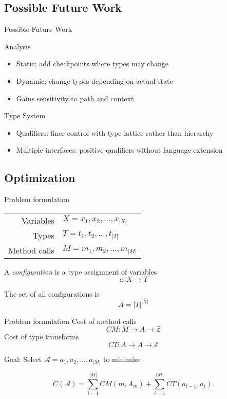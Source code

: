\documentclass{beamer}
\newcommand{\ZZ}{\mathbb{Z}}
\newcommand{\Acal}{\mathcal{A}}
\begin{document}
\subsection{Possible Future Work}
\begin{frame}{Possible Future Work}
  \begin{block}{Analysis}
    \begin{itemize}
    \item Static: add checkpoints where types may change
    \item Dynamic: change types depending on actual state
    \item Gains sensitivity to path and context
    \end{itemize}
  \end{block}
\pause
  \begin{block}{Type System}
    \begin{itemize}
    \item Qualifiers: finer control with type lattice rather than hierarchy
    \item Multiple interfaces: positive qualifiers without language extension
    \end{itemize}
  \end{block}
\end{frame}

\subsection{Optimization}
\begin{frame}{Problem formulation}
\begin{tabular}{rl}
Variables &$X = x_1, x_2, \dotsc, x_{|X|}$ \\
Types &$T = t_1, t_2, \dotsc, t_{|T|}$ \\
Method calls &$M = m_1, m_2, \dotsc, m_{|M|}$
\end{tabular}

A {\em configuration} is a type assignment of variables \[a : X \rightarrow T\]

The set of all configurations is \[A = |T|^{|X|}\]
\end{frame}

\begin{frame}{Problem formulation}
Cost of method calls \[CM: M \rightarrow A \rightarrow \ZZ\]
Cost of type transforms \[CT: A \rightarrow A \rightarrow \ZZ\]

Goal: Select $\Acal = a_1, a_2, \dotsc, a_{|M|}$ to minimize

\[C(\Acal) = \sum_{i = 1}^{|M|} CM(m, A_m) + \sum_{i = 1}^{|M|} CT(a_{i - 1}, a_i).\]

\end{frame}
\end{document}
